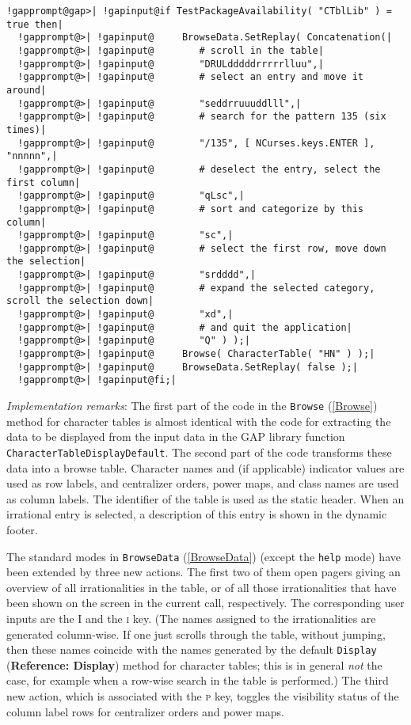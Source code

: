 \documentclass[a4paper,11pt]{report}
\begin{document}
{{{ 
\begin{Verbatim}[commandchars=!@|,fontsize=\small,frame=single,label=Example]
  !gapprompt@gap>| !gapinput@if TestPackageAvailability( "CTblLib" ) = true then|
  !gapprompt@>| !gapinput@     BrowseData.SetReplay( Concatenation(|
  !gapprompt@>| !gapinput@        # scroll in the table|
  !gapprompt@>| !gapinput@        "DRULdddddrrrrrlluu",|
  !gapprompt@>| !gapinput@        # select an entry and move it around|
  !gapprompt@>| !gapinput@        "seddrruuuddlll",|
  !gapprompt@>| !gapinput@        # search for the pattern 135 (six times)|
  !gapprompt@>| !gapinput@        "/135", [ NCurses.keys.ENTER ], "nnnnn",|
  !gapprompt@>| !gapinput@        # deselect the entry, select the first column|
  !gapprompt@>| !gapinput@        "qLsc",|
  !gapprompt@>| !gapinput@        # sort and categorize by this column|
  !gapprompt@>| !gapinput@        "sc",|
  !gapprompt@>| !gapinput@        # select the first row, move down the selection|
  !gapprompt@>| !gapinput@        "srdddd",|
  !gapprompt@>| !gapinput@        # expand the selected category, scroll the selection down|
  !gapprompt@>| !gapinput@        "xd",|
  !gapprompt@>| !gapinput@        # and quit the application|
  !gapprompt@>| !gapinput@        "Q" ) );|
  !gapprompt@>| !gapinput@     Browse( CharacterTable( "HN" ) );|
  !gapprompt@>| !gapinput@     BrowseData.SetReplay( false );|
  !gapprompt@>| !gapinput@fi;|
\end{Verbatim}
 

 \emph{Implementation remarks}: The first part of the code in the \texttt{Browse} (\ref{Browse}) method for character tables is almost identical with the code for extracting
the data to be displayed from the input data in the \textsf{GAP} library function \texttt{CharacterTableDisplayDefault}. The second part of the code transforms these data into a browse table.
Character names and (if applicable) indicator values are used as row labels,
and centralizer orders, power maps, and class names are used as column labels.
The identifier of the table is used as the static header. When an irrational
entry is selected, a description of this entry is shown in the dynamic footer. 

 The standard modes in \texttt{BrowseData} (\ref{BrowseData}) (except the \texttt{help} mode) have been extended by three new actions. The first two of them open
pagers giving an overview of all irrationalities in the table, or of all those
irrationalities that have been shown on the screen in the current call,
respectively. The corresponding user inputs are the \textsc{I} and the \textsc{i} key. (The names assigned to the irrationalities are generated column-wise. If
one just scrolls through the table, without jumping, then these names coincide
with the names generated by the default \texttt{Display} (\textbf{Reference: Display}) method for character tables; this is in general \emph{not} the case, for example when a row-wise search in the table is performed.) The
third new action, which is associated with the \textsc{p} key, toggles the visibility status of the column label rows for centralizer
orders and power maps. 

}}}
\end{document}
